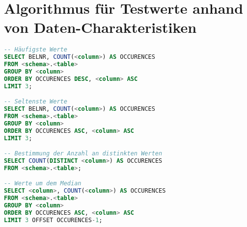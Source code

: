 \section{Algorithmus für Testwerte anhand von Daten-Charakteristiken}

\begin{lstlisting}[caption={Bestimmung von vorzuschlagenden Testwerten}, label={lst:distinctvalues}, language=SQL]
-- Häufigste Werte
SELECT BELNR, COUNT(<column>) AS OCCURENCES
FROM <schema>.<table>
GROUP BY <column>
ORDER BY OCCURENCES DESC, <column> ASC
LIMIT 3;

-- Seltenste Werte
SELECT BELNR, COUNT(<column>) AS OCCURENCES
FROM <schema>.<table>
GROUP BY <column>
ORDER BY OCCURENCES ASC, <column> ASC
LIMIT 3;

-- Bestimmung der Anzahl an distinkten Werten
SELECT COUNT(DISTINCT <column>) AS OCCURENCES
FROM <schema>.<table>;

-- Werte um dem Median
SELECT <column>, COUNT(<column>) AS OCCURENCES
FROM <schema>.<table>
GROUP BY <column>
ORDER BY OCCURENCES ASC, <column> ASC
LIMIT 3 OFFSET OCCURENCES-1;
\end{lstlisting}